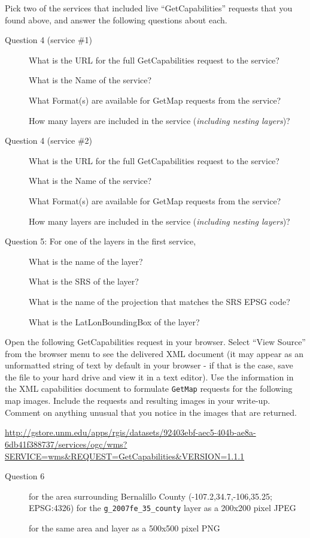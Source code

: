 \documentclass[]{book}
\begin{document}
Pick two of the services that included live ``GetCapabilities'' requests
that you found above, and answer the following questions about each.

\begin{description}
\item[Question 4 (service \#1)]
What is the URL for the full GetCapabilities request to the service?

What is the Name of the service?

What Format(s) are available for GetMap requests from the service?

How many layers are included in the service (\emph{including nesting
layers})?
\item[Question 4 (service \#2)]
What is the URL for the full GetCapabilities request to the service?

What is the Name of the service?

What Format(s) are available for GetMap requests from the service?

How many layers are included in the service (\emph{including nesting
layers})?
\item[Question 5: For one of the layers in the first service,]
What is the name of the layer?

What is the SRS of the layer?

What is the name of the projection that matches the SRS EPSG code?

What is the LatLonBoundingBox of the layer?
\end{description}

Open the following GetCapabilities request in your browser. Select
``View Source'' from the browser menu to see the delivered XML document
(it may appear as an unformatted string of text by default in your
browser - if that is the case, save the file to your hard drive and view
it in a text editor). Use the information in the XML capabilities
document to formulate \texttt{GetMap} requests for the following map
images. Include the requests and resulting images in your write-up.
Comment on anything unusual that you notice in the images that are
returned.

\url{http://gstore.unm.edu/apps/rgis/datasets/92403ebf-aec5-404b-ae8a-6db41f388737/services/ogc/wms?SERVICE=wms\&REQUEST=GetCapabilities\&VERSION=1.1.1}

\begin{description}
\item[Question 6]
for the area surrounding Bernalillo County (-107.2,34.7,-106,35.25;
EPSG:4326) for the \texttt{g\_2007fe\_35\_county} layer as a 200x200
pixel JPEG

for the same area and layer as a 500x500 pixel PNG
\end{description}
\end{document}
